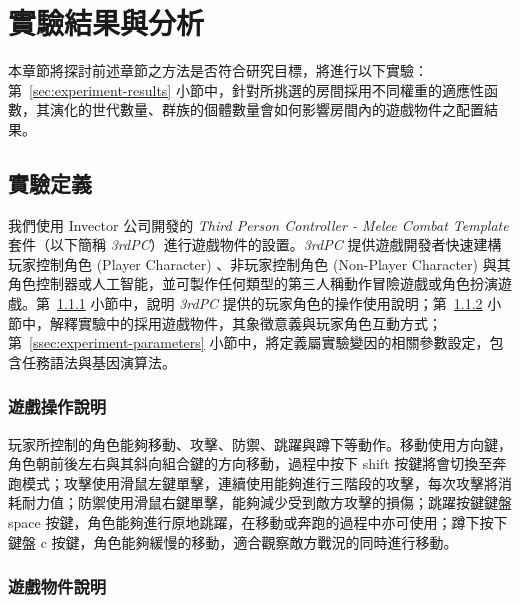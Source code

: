 \newcommand{\garesultstable}[5]{{
\begin{table}[H]
  \centering
  \caption{實驗 #2 - 共 #3 回合的最佳個體之標準化加權適應值}
  \label{tbl:result-of-experiment-#1}
  \bigskip
  \vspace{-5mm}
  \garesultssubtable{#4}
  \garesultssubtable{#5}
\end{table}
}}

\chapter{實驗結果與分析}
\label{cha:experiment}

本章節將探討前述章節之方法是否符合研究目標，將進行以下實驗：第~\ref{sec:experiment-results} 小節中，針對所挑選的房間採用不同權重的適應性函數，其演化的世代數量、群族的個體數量會如何影響房間內的遊戲物件之配置結果。

\section{實驗定義}
\label{sec:experiment-definition}

我們使用 Invector 公司開發的 \textit{Third Person Controller - Melee Combat Template} 套件（以下簡稱 \textit{3rdPC}）進行遊戲物件的設置。\textit{3rdPC} 提供遊戲開發者快速建構玩家控制角色 (Player Character) 、非玩家控制角色 (Non-Player Character) 與其角色控制器或人工智能，並可製作任何類型的第三人稱動作冒險遊戲或角色扮演遊戲。第~\ref{ssec:experiment-gameplaymanual} 小節中，說明 \textit{3rdPC} 提供的玩家角色的操作使用說明；第~\ref{ssec:experiment-gameobjects} 小節中，解釋實驗中的採用遊戲物件，其象徵意義與玩家角色互動方式；第~\ref{ssec:experiment-parameters} 小節中，將定義屬實驗變因的相關參數設定，包含任務語法與基因演算法。

\subsection{遊戲操作說明}
\label{ssec:experiment-gameplaymanual}

玩家所控制的角色能夠移動、攻擊、防禦、跳躍與蹲下等動作。移動使用方向鍵，角色朝前後左右與其斜向組合鍵的方向移動，過程中按下 shift 按鍵將會切換至奔跑模式；攻擊使用滑鼠左鍵單擊，連續使用能夠進行三階段的攻擊，每次攻擊將消耗耐力值；防禦使用滑鼠右鍵單擊，能夠減少受到敵方攻擊的損傷；跳躍按鍵鍵盤 space 按鍵，角色能夠進行原地跳躍，在移動或奔跑的過程中亦可使用；蹲下按下鍵盤 c 按鍵，角色能夠緩慢的移動，適合觀察敵方戰況的同時進行移動。

\subsection{遊戲物件說明}
\label{ssec:experiment-gameobjects}

